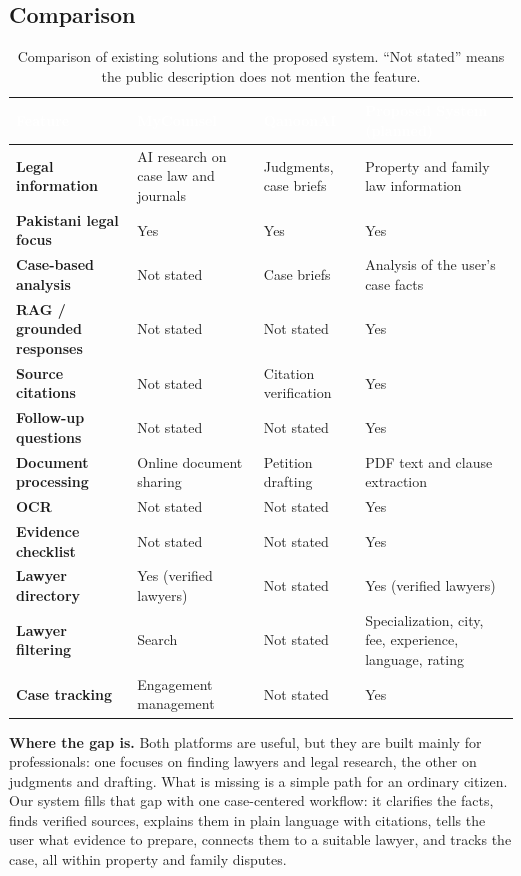 \documentclass[12pt,a4paper]{report}
\newcommand{\thd}[1]{\textcolor{white}{\textbf{#1}}}
\newcommand{\headrow}{\rowcolor{tablehead}}
\begin{document}
\subsection*{Comparison}
\begin{table}[H]
\centering
\caption[Comparison of existing solutions and the proposed system]{Comparison of existing solutions and the proposed system. ``Not stated'' means the public description does not mention the feature.}
\label{tab:comparison}
\begin{tabular}{|L{3.2cm}|L{3.3cm}|L{3.3cm}|L{3.8cm}|}
\hline
\headrow \thd{Feature} & \thd{MyCounsel} & \thd{QanoonAI} & \thd{Proposed System (planned)} \\ \hline
\textbf{Legal information} & AI research on case law and journals & Judgments, case briefs & Property and family law information \\ \hline
{}\textbf{Pakistani legal focus} & Yes & Yes & Yes \\ \hline
\textbf{Case-based analysis} & Not stated & Case briefs & Analysis of the user's case facts \\ \hline
{}\textbf{RAG / grounded responses} & Not stated & Not stated & Yes \\ \hline
\textbf{Source citations} & Not stated & Citation verification & Yes \\ \hline
{}\textbf{Follow-up questions} & Not stated & Not stated & Yes \\ \hline
\textbf{Document processing} & Online document sharing & Petition drafting & PDF text and clause extraction \\ \hline
{}\textbf{OCR} & Not stated & Not stated & Yes \\ \hline
\textbf{Evidence checklist} & Not stated & Not stated & Yes \\ \hline
{}\textbf{Lawyer directory} & Yes (verified lawyers) & Not stated & Yes (verified lawyers) \\ \hline
\textbf{Lawyer filtering} & Search & Not stated & Specialization, city, fee, experience, language, rating \\ \hline
{}\textbf{Case tracking} & Engagement management & Not stated & Yes \\ \hline
\end{tabular}
\end{table}

\textbf{Where the gap is.} Both platforms are useful, but they are built mainly for professionals: one focuses on finding lawyers and legal research, the other on judgments and drafting. What is missing is a simple path for an ordinary citizen. Our system fills that gap with one case-centered workflow: it clarifies the facts, finds verified sources, explains them in plain language with citations, tells the user what evidence to prepare, connects them to a suitable lawyer, and tracks the case, all within property and family disputes.
\end{document}
